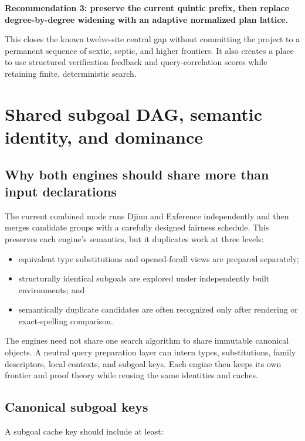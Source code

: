 \documentclass[11pt]{article}
\newcommand{\Djinn}{Djinn}
\newcommand{\Exference}{Exference}
\newenvironment{recommendation}[1]
{\par\medskip\noindent\colorbox{GoodBg}{\parbox{\dimexpr\linewidth-2\fboxsep\relax}{\sffamily\bfseries #1}}\par\smallskip}
{\par\medskip}
\begin{document}
\begin{recommendation}{Recommendation 3: preserve the current quintic prefix, then replace degree-by-degree widening with an adaptive normalized plan lattice.}
This closes the known twelve-site central gap without committing the project to
a permanent sequence of sextic, septic, and higher frontiers.  It also creates
a place to use structured verification feedback and query-correlation scores
while retaining finite, deterministic search.
\end{recommendation}

\section{Shared subgoal DAG, semantic identity, and dominance}
\label{sec:dag}

\subsection{Why both engines should share more than input declarations}

The current combined mode runs \Djinn{} and \Exference{} independently and
then merges candidate groups with a carefully designed fairness schedule.  This
preserves each engine's semantics, but it duplicates work at three levels:

\begin{itemize}
  \item equivalent type substitutions and opened-forall views are prepared
    separately;
  \item structurally identical subgoals are explored under independently built
    environments; and
  \item semantically duplicate candidates are often recognized only after
    rendering or exact-spelling comparison.
\end{itemize}

The engines need not share one search algorithm to share immutable canonical
objects.  A neutral query preparation layer can intern types, substitutions,
family descriptors, local contexts, and subgoal keys.  Each engine then keeps
its own frontier and proof theory while reusing the same identities and caches.

\subsection{Canonical subgoal keys}

A subgoal cache key should include at least:
\end{document}
